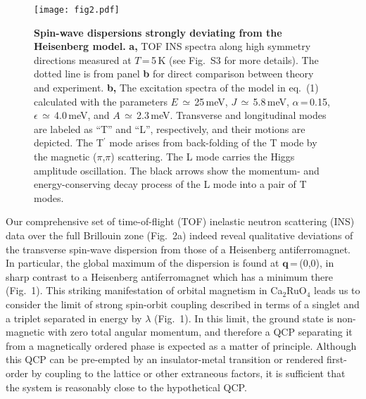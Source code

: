 \documentclass[twocolumn,prb,aps,showpacs]{revtex4-1}
\newcommand{\CRO}{{Ca$_2$RuO$_4$} }
\begin{document}
\begin{figure}
\centerline{\texttt{[image: fig2.pdf]}}
\caption{{\bf Spin-wave dispersions strongly deviating from the Heisenberg model.} {\bf a,} TOF INS spectra along high symmetry directions measured at $T$\,=\,5\,K (see Fig.~S3 for more details). The dotted line is from panel {\bf b} for direct comparison between theory and experiment. {\bf b,} The excitation spectra of the model in eq.~(1) calculated with the parameters $E$\,$\simeq$\,25\,meV, $J$\,$\simeq$\,5.8\,meV, $\alpha$\,=\,0.15, $\epsilon$\,$\simeq$\,4.0\,meV, and $A$\,$\simeq$\,2.3\,meV. Transverse and longitudinal modes are labeled as ``T'' and ``L'', respectively, and their motions are depicted. The T$^\prime$ mode arises from back-folding of the T mode by the magnetic ($\pi$,$\pi$) scattering. The L mode carries the Higgs amplitude oscillation. The black arrows show the momentum- and energy-conserving decay process of the L mode into a pair of T modes.}\label{fig:fig1}
\end{figure}

Our comprehensive set of time-of-flight (TOF) inelastic neutron scattering (INS) data over the full Brillouin zone (Fig.~2a) indeed reveal qualitative deviations of the transverse spin-wave dispersion from those of a Heisenberg antiferromagnet. In particular, the global maximum of the dispersion is found at $\mathbf{q}$\,=\,(0,0), in sharp contrast to a Heisenberg antiferromagnet which has a minimum there (Fig.~1). This striking manifestation of orbital magnetism in \CRO\cite{Mizokawa_2001,Haverkort_2008,Fatuzzo_2015} leads us to consider the limit of strong spin-orbit coupling described in terms of a singlet and a triplet separated in energy by $\lambda$ (Fig.~1). In this limit, the ground state is non-magnetic with zero total angular momentum, and therefore a QCP separating it from a magnetically ordered phase is expected as a matter of principle.  Although this QCP can be pre-empted by an insulator-metal transition\cite{Taniguchi_2013,Nakamura_2002} or rendered first-order by coupling to the lattice or other extraneous factors, it is sufficient that the system is reasonably close to the hypothetical QCP.
\end{document}
